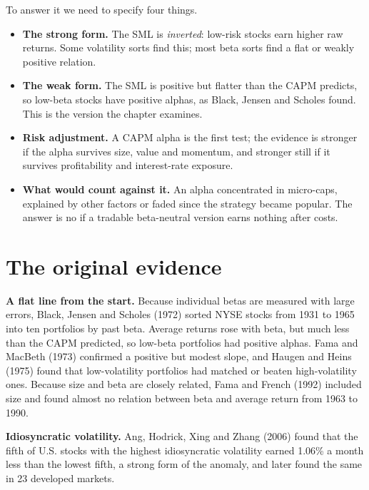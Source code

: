 To answer it we need to specify four things.

\begin{itemize}
  \item \textbf{The strong form.} The SML is \emph{inverted}: low-risk stocks earn higher raw returns. Some volatility sorts find this; most beta sorts find a flat or weakly positive relation.
  \item \textbf{The weak form.} The SML is positive but flatter than the CAPM predicts, so low-beta stocks have positive alphas, as Black, Jensen and Scholes found. This is the version the chapter examines.
  \item \textbf{Risk adjustment.} A CAPM alpha is the first test; the evidence is stronger if the alpha survives size, value and momentum, and stronger still if it survives profitability and interest-rate exposure.
  \item \textbf{What would count against it.} An alpha concentrated in micro-caps, explained by other factors or faded since the strategy became popular. The answer is no if a tradable beta-neutral version earns nothing after costs.
\end{itemize}

\section{The original evidence}
\label{sec:18-evidence}

\textbf{A flat line from the start.} Because individual betas are measured with large errors, Black, Jensen and Scholes (1972) sorted NYSE stocks from 1931 to 1965 into ten portfolios by past beta. Average returns rose with beta, but much less than the CAPM predicted, so low-beta portfolios had positive alphas. Fama and MacBeth (1973) confirmed a positive but modest slope, and Haugen and Heins (1975) found that low-volatility portfolios had matched or beaten high-volatility ones. Because size and beta are closely related, Fama and French (1992) included size and found almost no relation between beta and average return from 1963 to 1990.

\textbf{Idiosyncratic volatility.} Ang, Hodrick, Xing and Zhang (2006) found that the fifth of U.S. stocks with the highest idiosyncratic volatility earned 1.06\% a month less than the lowest fifth, a strong form of the anomaly, and later found the same in 23 developed markets.

